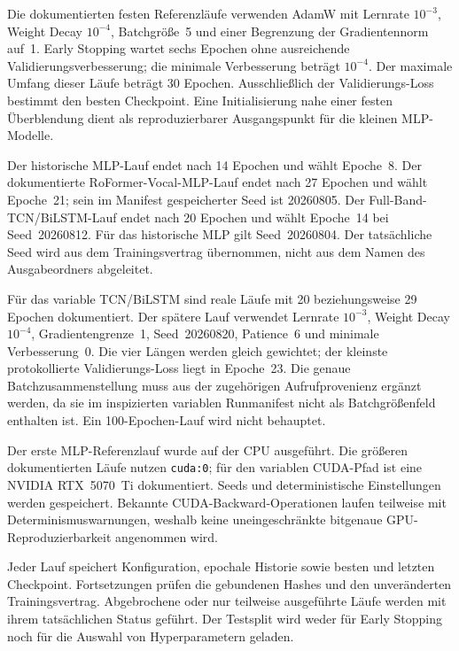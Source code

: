 Die dokumentierten festen Referenzläufe verwenden AdamW mit Lernrate $10^{-3}$, Weight Decay $10^{-4}$, Batchgröße~5 und einer Begrenzung der Gradientennorm auf~1. Early Stopping wartet sechs Epochen ohne ausreichende Validierungsverbesserung; die minimale Verbesserung beträgt $10^{-4}$. Der maximale Umfang dieser Läufe beträgt 30 Epochen. Ausschließlich der Validierungs-Loss bestimmt den besten Checkpoint. Eine Initialisierung nahe einer festen Überblendung dient als reproduzierbarer Ausgangspunkt für die kleinen MLP-Modelle.

Der historische MLP-Lauf endet nach 14 Epochen und wählt Epoche~8. Der dokumentierte RoFormer-Vocal-MLP-Lauf endet nach 27 Epochen und wählt Epoche~21; sein im Manifest gespeicherter Seed ist 20260805. Der Full-Band-TCN/BiLSTM-Lauf endet nach 20 Epochen und wählt Epoche~14 bei Seed~20260812. Für das historische MLP gilt Seed~20260804. Der tatsächliche Seed wird aus dem Trainingsvertrag übernommen, nicht aus dem Namen des Ausgabeordners abgeleitet.

Für das variable TCN/BiLSTM sind reale Läufe mit 20 beziehungsweise 29 Epochen dokumentiert. Der spätere Lauf verwendet Lernrate $10^{-3}$, Weight Decay $10^{-4}$, Gradientengrenze~1, Seed~20260820, Patience~6 und minimale Verbesserung~0. Die vier Längen werden gleich gewichtet; der kleinste protokollierte Validierungs-Loss liegt in Epoche~23. Die genaue Batchzusammenstellung muss aus der zugehörigen Aufrufprovenienz ergänzt werden, da sie im inspizierten variablen Runmanifest nicht als Batchgrößenfeld enthalten ist. Ein 100-Epochen-Lauf wird nicht behauptet.

Der erste MLP-Referenzlauf wurde auf der CPU ausgeführt. Die größeren dokumentierten Läufe nutzen \texttt{cuda:0}; für den variablen CUDA-Pfad ist eine NVIDIA RTX~5070~Ti dokumentiert. Seeds und deterministische Einstellungen werden gespeichert. Bekannte CUDA-Backward-Operationen laufen teilweise mit Determinismuswarnungen, weshalb keine uneingeschränkte bitgenaue GPU-Reproduzierbarkeit angenommen wird.

Jeder Lauf speichert Konfiguration, epochale Historie sowie besten und letzten Checkpoint. Fortsetzungen prüfen die gebundenen Hashes und den unveränderten Trainingsvertrag. Abgebrochene oder nur teilweise ausgeführte Läufe werden mit ihrem tatsächlichen Status geführt. Der Testsplit wird weder für Early Stopping noch für die Auswahl von Hyperparametern geladen.



